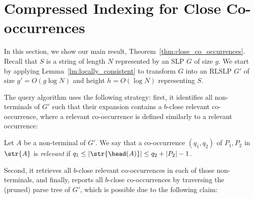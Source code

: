 \section{Compressed Indexing for Close Co-occurrences}\label{indexgapped:sec:close}
In this section, we show our main result, Theorem~\ref{thm:close_co_occurrences}. Recall that $S$ is a string of length $N$ represented by an SLP $G$ of size $g$. We start by applying Lemma~\ref{lm:locally_consistent} to transform $G$ into an RLSLP $G'$ of size $g' = O(g \log N)$ and height $h = O(\log N)$ representing $S$. 

The query algorithm uses the following strategy: first, it identifies all non-terminals of $G'$ such that their expansion contains a $b$-close relevant co-occurrence, where a relevant co-occurrence is defined similarly to a relevant occurrence: 

\begin{definition}
Let $A$ be a non-terminal of $G'$. We say that a co-occurrence $(q_1,q_2)$ of $P_1, P_2$ in $\str{A}$ is \emph{relevant} if $q_1 \le |\str{\head(A)}| \le q_2 + |P_2|-1$.   
\end{definition}

Second, it retrieves all $b$-close relevant co-occurrences in each of those non-terminals, and finally, reports all $b$-close co-occurrences by traversing the (pruned) parse tree of $G'$, which is possible due to the following claim:

